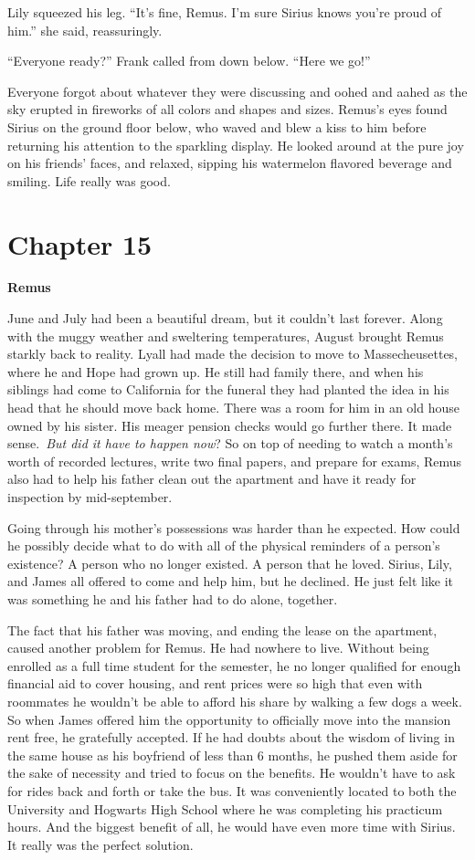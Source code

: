 \documentclass[12pt,twoside,openright]{memoir}
\begin{document}
Lily squeezed his leg. ``It's fine, Remus. I'm sure Sirius knows you're proud of him.'' she said, reassuringly. 

``Everyone ready?'' Frank called from down below. ``Here we go!''

Everyone forgot about whatever they were discussing and oohed and aahed as the sky erupted in fireworks of all colors and shapes and sizes. Remus's eyes found Sirius on the ground floor below, who waved and blew a kiss to him before returning his attention to the sparkling display. He looked around at the pure joy on his friends' faces, and relaxed, sipping his watermelon flavored beverage and smiling. Life really was good.

\chapter*{Chapter 15}

\textbf{Remus} 

June and July had been a beautiful dream, but it couldn't last forever. Along with the muggy weather and sweltering temperatures, August brought Remus starkly back to reality. Lyall had made the decision to move to Massecheusettes, where he and Hope had grown up. He still had family there, and when his siblings had come to California for the funeral they had planted the idea in his head that he should move back home. There was a room for him in an old house owned by his sister. His meager pension checks would go further there. It made sense.\ \textit{But did it have to happen now}? So on top of needing to watch a month's worth of recorded lectures, write two final papers, and prepare for exams, Remus also had to help his father clean out the apartment and have it ready for inspection by mid-september.

Going through his mother's possessions was harder than he expected. How could he possibly decide what to do with all of the physical reminders of a person's existence? A person who no longer existed. A person that he loved. Sirius, Lily, and James all offered to come and help him, but he declined. He just felt like it was something he and his father had to do alone, together.

The fact that his father was moving, and ending the lease on the apartment, caused another problem for Remus. He had nowhere to live. Without being enrolled as a full time student for the semester, he no longer qualified for enough financial aid to cover housing, and rent prices were so high that even with roommates he wouldn't be able to afford his share by walking a few dogs a week. So when James offered him the opportunity to officially move into the mansion rent free, he gratefully accepted. If he had doubts about the wisdom of living in the same house as his boyfriend of less than 6 months, he pushed them aside for the sake of necessity and tried to focus on the benefits. He wouldn't have to ask for rides back and forth or take the bus. It was conveniently located to both the University and Hogwarts High School where he was completing his practicum hours. And the biggest benefit of all, he would have even more time with Sirius. It really was the perfect solution.
\end{document}
